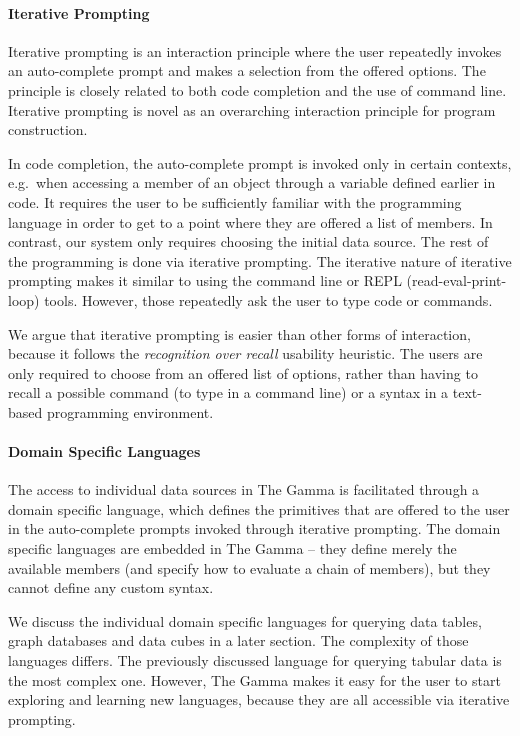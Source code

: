 \documentclass{sigchi}
\begin{document}
\paragraph{Iterative Prompting}
Iterative prompting is an interaction principle where the user repeatedly invokes an
auto-complete prompt and makes a selection from the offered options. The principle is closely
related to both code completion and the use of command line. Iterative prompting is novel as an
overarching interaction principle for program construction.

In code completion, the auto-complete
prompt is invoked only in certain contexts, e.g.~when accessing a member of an object through a
variable defined earlier in code. It requires the user to be sufficiently familiar with the
programming language in order to get to a point where they are offered a list of members. In
contrast, our system only requires choosing the initial data source. The rest of the programming
is done via iterative prompting. The iterative nature of iterative prompting makes it similar to
using the command line or REPL (read-eval-print-loop) tools. However, those repeatedly ask the
user to type code or commands.

We argue that iterative prompting is easier than other forms of interaction, because it
follows the \emph{recognition over recall} usability heuristic. The users are only required to
choose from an offered list of options, rather than having to recall a possible command
(to type in a command line) or a syntax in a text-based programming environment.

\paragraph{Domain Specific Languages}
The access to individual data sources in The Gamma is facilitated through a domain specific
language, which defines the primitives that are offered to the user in the auto-complete prompts
invoked through iterative prompting. The domain specific languages are embedded in The Gamma --
they define merely the available members (and specify how to evaluate a chain of members), but
they cannot define any custom syntax.

We discuss the individual domain specific languages for querying data tables, graph databases and
data cubes in a later section. The complexity of those languages differs. The previously discussed
language for querying tabular data is the most complex one. However, The Gamma makes it easy for
the user to start exploring and learning new languages, because they are all accessible via
iterative prompting.
\end{document}
